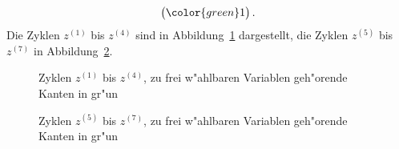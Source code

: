 \begin{loesung}
\[\begin{pmatrix}
\color{green} 1
\end{pmatrix}.
\]
Die Zyklen $z^{(1)}$ bis $z^{(4)}$ sind in Abbildung~\ref{10000028:z1bisz4}
dargestellt, die Zyklen $z^{(5)}$ bis $z^{(7)}$ in Abbildung~\ref{10000028:z5bisz7}.
\begin{figure}
\centering
{}
\caption{Zyklen $z^{(1)}$ bis $z^{(4)}$, zu frei w"ahlbaren Variablen
geh"orende Kanten in gr"un
\label{10000028:z1bisz4}}
\end{figure}
\begin{figure}
\centering
{}
\caption{Zyklen $z^{(5)}$ bis $z^{(7)}$, zu frei w"ahlbaren Variablen
geh"orende Kanten in gr"un
\label{10000028:z5bisz7}}
\end{figure}

\end{loesung}
